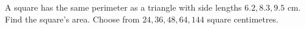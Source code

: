 A square has the same perimeter as a triangle with side lengths $6.2,8.3,9.5$ cm. Find the square's area. Choose from $24,36,48,64,144$ square centimetres.
